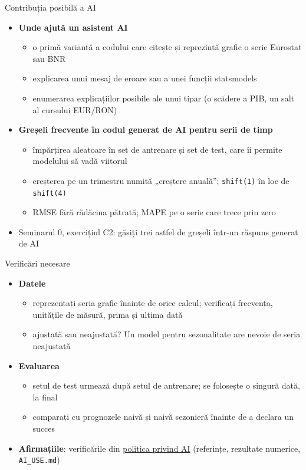 \begin{frame}{Contribuția posibilă a AI}
\itemsize{\small}
\begin{itemize}
    \item \textbf{Unde ajută un asistent AI}
    \begin{itemize}
        \item o primă variantă a codului care citește și reprezintă grafic o serie Eurostat sau BNR
        \item explicarea unui mesaj de eroare sau a unei funcții statsmodels
        \item enumerarea explicațiilor posibile ale unui tipar (o scădere a PIB, un salt al cursului EUR/RON)
    \end{itemize}
    \item \textbf{Greșeli frecvente în codul generat de AI pentru serii de timp}
    \begin{itemize}
        \item împărțirea aleatoare în set de antrenare și set de test, care îi permite modelului să vadă viitorul
        \item creșterea pe un trimestru numită „creștere anuală”; \texttt{shift(1)} în loc de \texttt{shift(4)}
        \item RMSE fără rădăcina pătrată; MAPE pe o serie care trece prin zero
    \end{itemize}
    \item Seminarul 0, exercițiul C2: găsiți trei astfel de greșeli într-un răspuns generat de AI
\end{itemize}
\end{frame}

\begin{frame}{Verificări necesare}
\itemsize{\small}
\begin{itemize}
    \item \textbf{Datele}
    \begin{itemize}
        \item reprezentați seria grafic înainte de orice calcul; verificați frecvența, unitățile de măsură, prima și ultima dată
        \item ajustată sau neajustată? Un model pentru sezonalitate are nevoie de seria neajustată
    \end{itemize}
    \item \textbf{Evaluarea}
    \begin{itemize}
        \item setul de test urmează după setul de antrenare; se folosește o singură dată, la final
        \item comparați cu prognozele naivă și naivă sezonieră înainte de a declara un succes
    \end{itemize}
    \item \textbf{Afirmațiile}: verificările din \hyperlink{ch0-ai-policy}{politica privind AI} (referințe, rezultate numerice, \texttt{AI\_USE.md})
\end{itemize}
\end{frame}


